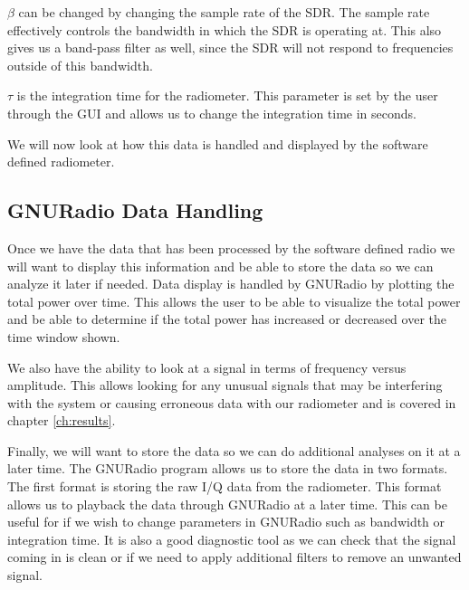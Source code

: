 
$\beta$ can be changed by changing the sample rate of the SDR.  The sample rate effectively controls the bandwidth in which the SDR is operating at.  This also gives us a band-pass filter as well, since the SDR will not respond to frequencies outside of this bandwidth.  

$\tau$ is the integration time for the radiometer.  This parameter is set by the user through the GUI and allows us to change the integration time in seconds.

We will now look at how this data is handled and displayed by the software defined radiometer.

\subsection{GNURadio Data Handling}
Once we have the data that has been processed by the software defined radio we will want to display this information and be able to store the data so we can analyze it later if needed.  Data display is handled by GNURadio by plotting the total power over time.  This allows the user to be able to visualize the total power and be able to determine if the total power has increased or decreased over the time window shown.  

We also have the ability to look at a signal in terms of frequency versus amplitude.  This allows looking for any unusual signals that may be interfering with the system or causing erroneous data with our radiometer and is covered in chapter \ref{ch:results}.  

Finally, we will want to store the data so we can do additional analyses on it at a later time.  The GNURadio program allows us to store the data in two formats.  The first format is storing the raw I/Q data from the radiometer.  This format allows us to playback the data through GNURadio at a later time.  This can be useful for if we wish to change parameters in GNURadio such as bandwidth or integration time.  It is also a good diagnostic tool as we can check that the signal coming in is clean or if we need to apply additional filters to remove an unwanted signal.

